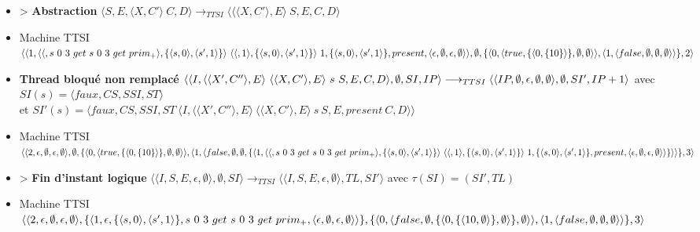 \documentclass[10pt,a4paper]{report}
\begin{document}
\begin{itemize}
 				\item[] > \textbf{Abstraction} $\langle S,E,\langle X,C'\rangle~C,D\rangle
 				\longrightarrow_{TTSI} 
 				\langle \langle\langle X,C'\rangle,E\rangle~S,E,C,D\rangle$
 				\item[] Machine TTSI $\langle\langle 1,\langle\langle,s~0~3~get~s~0~3~get~prim_{+}\rangle,\{\langle s,0\rangle,\langle s',1\rangle\}\rangle~\langle\langle,1\rangle,\{\langle s,0\rangle,\langle s',1\rangle\}\rangle~1,\{\langle s,0\rangle,\langle s',1\rangle\},present ,\langle\epsilon,\emptyset,\epsilon,\emptyset\rangle\rangle,\\\emptyset,\{\langle 0,\langle true,\{\langle 0,\{10\}\rangle\},\emptyset,\emptyset\rangle\rangle,\langle 1,\langle false,\emptyset,\emptyset,\emptyset\rangle\rangle\},2\rangle$
 				\item[] \textbf{Thread bloqué non remplacé } $\langle\langle I,\langle\langle X',C''\rangle,E\rangle~\langle\langle X,C'\rangle,E\rangle~s~S,E,C,D\rangle,\emptyset,SI,IP\rangle 
 				\longrightarrow_{TTSI} 
 				\\\langle\langle IP,\emptyset,\epsilon,\emptyset,\emptyset\rangle,\emptyset,SI',IP+1\rangle$
 				avec $SI(s) = \langle faux,CS,SSI,ST\rangle$
 				\\et $SI'(s) = \langle faux,CS,SSI,ST~\langle I,\langle\langle X',C''\rangle,E\rangle~\langle\langle X,C'\rangle,E\rangle~s~S,E,present~C,D\rangle\rangle$
 				\item[] Machine TTSI $\langle\langle 2,\epsilon,\emptyset,\epsilon,\emptyset\rangle,\emptyset,\{\langle 0,\langle true,\{\langle 0,\{10\}\rangle\},\emptyset,\emptyset\rangle\rangle,\langle 1,\langle false,\emptyset,\emptyset,\{\langle 1,\langle\langle,s~0~3~get~s~0~3~get~prim_{+}\rangle,\\\{\langle s,0\rangle,\langle s',1\rangle\}\rangle~\langle\langle,1\rangle, \{\langle s,0\rangle,\langle s',1\rangle\}\rangle~1,\{\langle s,0\rangle,\langle s',1\rangle\},present ,\langle\epsilon,\emptyset,\epsilon,\emptyset\rangle\rangle\}\rangle\rangle\},3\rangle$
 				\item[] > \textbf{Fin d'instant logique} $\langle\langle I,S,E,\epsilon,\emptyset \rangle ,\emptyset,SI\rangle 
 				\longrightarrow_{TTSI} 
 				\langle\langle I,S,E,\epsilon,\emptyset\rangle,TL,SI'\rangle$
 				avec $\tau(SI) = (SI',TL)$
 				\item[] Machine TTSI $\langle\langle 2,\epsilon,\emptyset,\epsilon,\emptyset\rangle,\{\langle 1,\epsilon,\{\langle s,0\rangle,\langle s',1\rangle\},s~0~3~get~s~0~3~get~prim_{+} ,\langle\epsilon,\emptyset,\epsilon,\emptyset\rangle\rangle\},\\\{\langle 0,\langle false,\emptyset,\{\langle 0,\{\langle 10,\emptyset\rangle\},\emptyset\rangle\},\emptyset\rangle\rangle,\langle 1,\langle false,\emptyset,\emptyset,\emptyset\rangle\rangle\},3\rangle$ 

\end{itemize}
\end{document}
